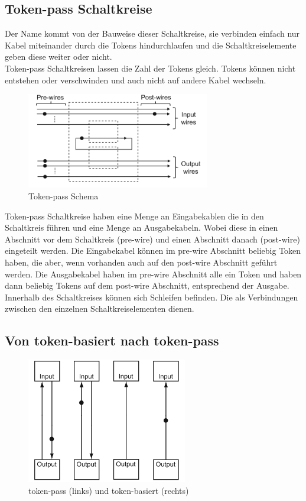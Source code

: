 \documentclass[11pt,a4paper]{article}
\begin{document}

\subsection{Token-pass Schaltkreise}
Der Name kommt von der Bauweise dieser Schaltkreise, sie verbinden einfach nur
Kabel miteinander durch die Tokens hindurchlaufen und die Schaltkreiselemente
geben diese weiter oder nicht. \\
%
Token-pass Schaltkreisen lassen die Zahl der Tokens gleich.
%
Tokens können nicht entstehen oder verschwinden und auch 
nicht auf andere Kabel wechseln.

\begin{figure}[h]
    \centering
    \includegraphics[width=8cm]{bilder/TokenPassScheme.png}
    \caption{Token-pass Schema}
    \label{fig:tokenPassScheme}
\end{figure} 


Token-pass Schaltkreise haben eine Menge an Eingabekablen die in
den Schaltkreis führen und eine Menge an Ausgabekabeln.
%
Wobei diese in einen Abschnitt vor dem Schaltkreis (pre-wire) und einen Abschnitt
danach (post-wire) eingeteilt werden.
%
Die Eingabekabel können im pre-wire Abschnitt beliebig Token haben, die aber, 
wenn vorhanden auch auf den post-wire Abschnitt geführt werden.
%
Die Ausgabekabel haben im pre-wire Abschnitt alle ein Token und haben dann
beliebig Tokens auf dem post-wire Abschnitt, entsprechend der Ausgabe.
%
Innerhalb des Schaltkreises können sich Schleifen befinden. 
%
Die als Verbindungen zwischen den einzelnen Schaltkreiselementen dienen.


\subsection{Von token-basiert nach token-pass}

\begin{figure}[h]
    \centering
    \includegraphics[width=7cm]{bilder/basedToPass.png}
    \caption{token-pass (links) und token-basiert (rechts)}
\end{figure}
\end{document}
